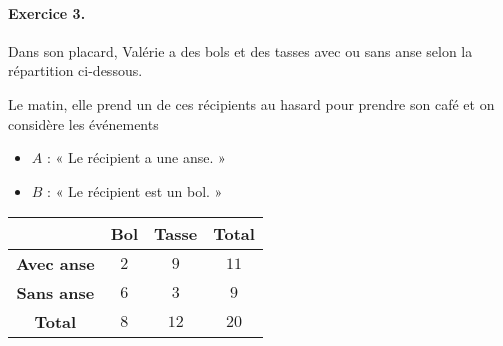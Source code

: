 \documentclass[11pt]{article}
\begin{document}
\paragraph{Exercice 3.} {\small Dans son placard, Valérie a des bols et des tasses avec
ou sans anse selon la répartition ci-dessous.}\\
\begin{minipage}{.6\textwidth}
Le matin, elle prend un de ces
récipients au hasard pour prendre son café et on considère les événements
\begin{itemize}
  \item $A$ : « Le récipient a une anse. »
  \item $B$ : « Le récipient est un bol. »
\end{itemize}
\end{minipage}
\begin{minipage}{.4\textwidth}
  \begin{center}
 \begin{tabular}{cccc}
  \toprule
  & \textbf{Bol} & \textbf{Tasse} & \textbf{Total} \\
  \midrule
  \textbf{Avec anse} & $2$ & $9$ & $11$ \\
  \textbf{Sans anse} & $6$ & $3$ & $9$ \\
  \textbf{Total} & $8$ & $12$ & $20$ \\
  \bottomrule
\end{tabular}
  \end{center}
\end{minipage}
\end{document}
